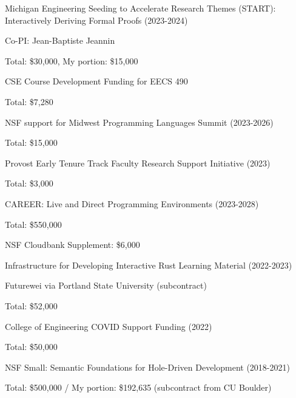\documentclass[10pt,letterpaper]{article}
\renewenvironment{itemize}{
  \begin{list}{}{
    \setlength{\leftmargin}{1.25em}
    \setlength{\itemsep}{0.25em}
    \setlength{\parskip}{0pt}
    \setlength{\parsep}{0.2em}
  }
}{
  \end{list}
}
\begin{document}
\begin{itemize}
  \item Michigan Engineering Seeding to Accelerate Research Themes (START):\\
        Interactively Deriving Formal Proofs (2023-2024)
        \begin{itemize}
          \item Co-PI: Jean-Baptiste Jeannin
          \item Total: \$30,000, My portion: \$15,000
        \end{itemize}
  \item CSE Course Development Funding for EECS 490
        \begin{itemize}
          \item Total: \$7,280
        \end{itemize}
  \item NSF support for Midwest Programming Languages Summit (2023-2026)
        \begin{itemize}
          \item Total: \$15,000
        \end{itemize}
  \item Provost Early Tenure Track Faculty Research Support Initiative (2023)
        \begin{itemize}
          \item Total: \$3,000
        \end{itemize}
  \item CAREER: Live and Direct Programming Environments (2023-2028)
        \begin{itemize}
          \item Total: \$550,000
          \item NSF Cloudbank Supplement: \$6,000
        \end{itemize}
  \item Infrastructure for Developing Interactive Rust Learning Material (2022-2023)
        \begin{itemize}
          \item Futurewei via Portland State University (subcontract)
          \item Total: \$52,000
        \end{itemize}
  \item College of Engineering COVID Support Funding (2022)
        \begin{itemize}
          \item Total: \$50,000
        \end{itemize}
  \item NSF Small: Semantic Foundations for Hole-Driven Development (2018-2021)
        \begin{itemize}
          \item Total: \$500,000 / My portion: \$192,635 (subcontract from CU Boulder)
        \end{itemize}
\end{itemize}
\end{document}

